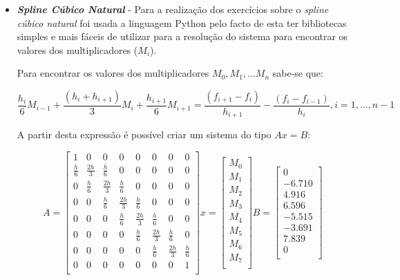 \documentclass[12pt, letterpaper,fleqn]{article}
\begin{document}
\begin{itemize}
    \item \textbf{\textit{Spline Cúbico Natural}} - Para a realização dos exercícios sobre o \textit{spline cúbico natural} foi usada a linguagem Python pelo facto de esta ter bibliotecas simples e mais fáceis de utilizar para a resolução do sistema para encontrar os valores dos multiplicadores (\textit{$M_i$}).
    
    Para encontrar os valores dos multiplicadores $M_0, M_1, ... M_n$ sabe-se que:
    
    $$\frac{h_i}{6}M_{i-1} + \frac{(h_i + h_{i+1})}{3}M_i + \frac{h_{i+1}}{6}M_{i+1} = \frac{(f_{i+1}-f_i)}{h_{i+1}} - \frac{(f_i - f_{i-1})}{h_i}, i = 1,..., n-1$$
    
    A partir desta expressão é possível criar um sistema do tipo $Ax = B$:
    
    $$
        A = \begin{bmatrix}
            1 & 0 & 0 & 0 & 0 & 0 & 0 & 0 \\[6pt]
            \frac{h}{6} & \frac{2h}{3} & \frac{h}{6} & 0 & 0 & 0 & 0 & 0 \\[6pt]
            0 & \frac{h}{6} & \frac{2h}{3} & \frac{h}{6} & 0 & 0 & 0 & 0 \\[6pt]
            0 & 0 & \frac{h}{6} & \frac{2h}{3} & \frac{h}{6} & 0 & 0 & 0 \\[6pt]
            0 & 0 & 0 & \frac{h}{6} & \frac{2h}{3} & \frac{h}{6} & 0 & 0 \\[6pt]
            0 & 0 & 0 & 0 & \frac{h}{6} & \frac{2h}{3} & \frac{h}{6} & 0 \\[6pt]
            0 & 0 & 0 & 0 & 0 & \frac{h}{6} & \frac{2h}{3} & \frac{h}{6} \\[6pt]
            0 & 0 & 0 & 0 & 0 & 0 & 0 & 1 \\
        \end{bmatrix}
        x = \begin{bmatrix}
            M_0 \\[6pt]
            M_1 \\[6pt]
            M_2 \\[6pt]
            M_3 \\[6pt]
            M_4 \\[6pt]
            M_5 \\[6pt]
            M_6 \\[6pt]
            M_7 \\[6pt]
        \end{bmatrix}
        B = \begin{bmatrix}
            0 \\[6pt] 
            -6.710 \\[6pt]
            4.916  \\[6pt]
            6.596  \\[6pt]
            -5.515 \\[6pt]
            -3.691 \\[6pt]
            7.839  \\[6pt]
            0 \\[6pt]
        \end{bmatrix}
    $$
    

\end{itemize}
\end{document}
